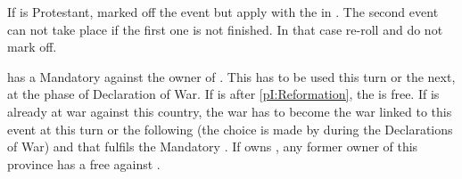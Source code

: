 
\aparag If \FRA is Protestant, marked off the event but apply \RD with the
\REVOLT in \FRA.
\aparag The second event can not take place if the first one is not
finished. In that case re-roll and do not mark off.

\phevnt
\aparag \FRA has a Mandatory \CB against the owner of \provinceLombardia. This
\CB has to be used this turn or the next, at the phase of Declaration of
War. If \FRA is \CATHCR after \ref{pI:Reformation}, the \CB is free.
\aparag If \FRA is already at war against this country, the war has to become
the war linked to this event at this turn or the following (the choice is made
by \FRA during the Declarations of War) and that fulfils the Mandatory \CB.
\aparag If \FRA owns \provinceLombardia, any former owner of this province has
a free \CB against \FRA.

